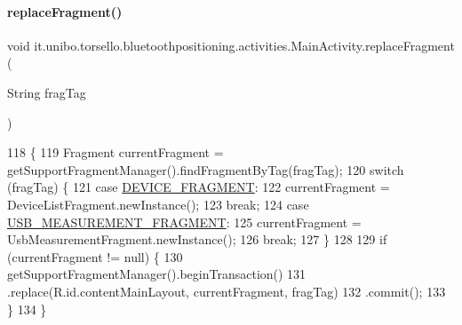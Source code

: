 \hypertarget{classit_1_1unibo_1_1torsello_1_1bluetoothpositioning_1_1activities_1_1MainActivity_a98db4478d28cd91118138d0b652ceb2c_a98db4478d28cd91118138d0b652ceb2c}{}\label{classit_1_1unibo_1_1torsello_1_1bluetoothpositioning_1_1activities_1_1MainActivity_a98db4478d28cd91118138d0b652ceb2c_a98db4478d28cd91118138d0b652ceb2c} 
\paragraph{\texorpdfstring{replace\+Fragment()}{replaceFragment()}}
{\footnotesize\ttfamily void it.\+unibo.\+torsello.\+bluetoothpositioning.\+activities.\+Main\+Activity.\+replace\+Fragment (\begin{DoxyParamCaption}\item[{String}]{frag\+Tag }\end{DoxyParamCaption})}


\begin{DoxyCode}
118                                                 \{
119         Fragment currentFragment = getSupportFragmentManager().findFragmentByTag(fragTag);
120         \textcolor{keywordflow}{switch} (fragTag) \{
121             \textcolor{keywordflow}{case} \hyperlink{classit_1_1unibo_1_1torsello_1_1bluetoothpositioning_1_1activities_1_1MainActivity_a2f77c0245ac2525dc58905e38e1817d1_a2f77c0245ac2525dc58905e38e1817d1}{DEVICE\_FRAGMENT}:
122                 currentFragment = DeviceListFragment.newInstance();
123                 \textcolor{keywordflow}{break};
124             \textcolor{keywordflow}{case} \hyperlink{classit_1_1unibo_1_1torsello_1_1bluetoothpositioning_1_1activities_1_1MainActivity_a64bac06e6db556ba1e36c8773e61137b_a64bac06e6db556ba1e36c8773e61137b}{USB\_MEASUREMENT\_FRAGMENT}:
125                 currentFragment = UsbMeasurementFragment.newInstance();
126                 \textcolor{keywordflow}{break};
127         \}
128 
129         \textcolor{keywordflow}{if} (currentFragment != null) \{
130             getSupportFragmentManager().beginTransaction()
131                     .replace(R.id.contentMainLayout, currentFragment, fragTag)
132                     .commit();
133         \}
134     \}
\end{DoxyCode}


